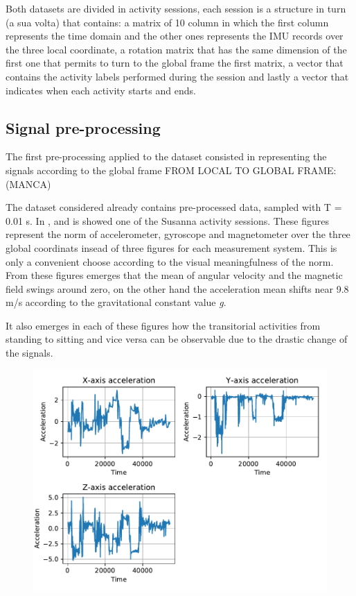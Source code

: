 Both datasets are divided in activity sessions, each session is a structure in turn (a sua volta) that contains: a matrix of 10 column in which the first column represents the time domain and the other ones represents the IMU records over the three local coordinate, a rotation matrix that has the same dimension of the first one that permits to turn to the global frame the first matrix, a vector that contains the activity labels performed during the session and lastly a vector that indicates when each activity starts and ends.

\subsection{Signal pre-processing}
The first pre-processing applied to the dataset consisted in representing the signals according to the global frame
FROM LOCAL TO GLOBAL FRAME: (MANCA)


The dataset considered already contains pre-processed data, sampled with T = 0.01 s. In ,  and  is showed one of the Susanna activity sessions. These figures represent the norm of accelerometer, gyroscope and magnetometer over the three global coordinats insead of three figures for each measurement system. This is only a convenient choose according to the visual meaningfulness of the norm.
From these figures emerges that the mean of angular velocity and the magnetic field swings around zero, on the other hand the acceleration mean shifts near 9.8 m/s according to the gravitational constant value \textit{g}.

It also emerges in each of these figures how the transitorial activities from standing to sitting and vice versa can be observable due to the drastic change of the signals.

\begin{figure}
\includegraphics[scale=0.55]{acceleration_susanna.pdf}
\caption{}
\label{fig:acc}
\end{figure}

